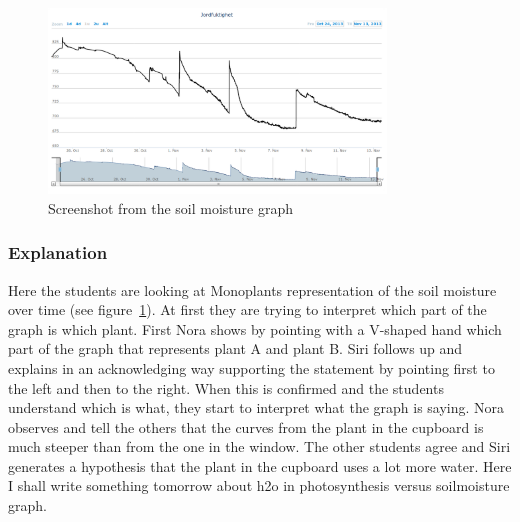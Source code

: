 \begin{figure}
	\centering
	\includegraphics[width=0.8\textwidth]{img/dataandanalasys/soilmoisturegraph.png}
	\caption{Screenshot from the soil moisture graph}
	\label{fig:soilmoistscreenshot}
\end{figure}

\subsubsection*{Explanation}
Here the students are looking at Monoplants representation of the soil moisture over time (see figure~\ref{fig:soilmoistscreenshot}). At first they are trying to interpret which part of the graph is which plant. First Nora shows by pointing with a V-shaped hand which part of the graph that represents plant A and plant B. Siri follows up and explains in an acknowledging way supporting the statement by pointing first to the left and then to the right. When this is confirmed and the students understand which is what, they start to interpret what the graph is saying. Nora observes and tell the others that the curves from the plant in the cupboard is much steeper than from the one in the window. The other students agree and Siri generates a hypothesis that the plant in the cupboard uses a lot more water. 
Here I shall write something tomorrow about h2o in photosynthesis versus soilmoisture graph.
